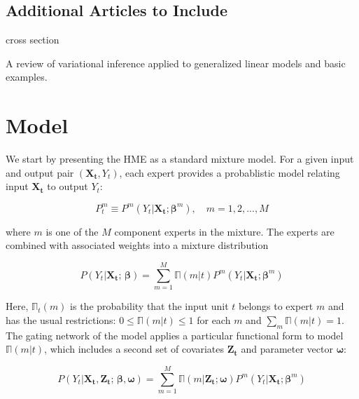 \documentclass[12pt]{article}
\newcommand{\expmixwt}[0]{\mathbb{\Pi}}
\begin{document}
\subsection{Additional Articles to Include}

\cite{JeffriesPfeiffer2001} cross section

\cite{BleiKucukelbirMcAuliffe2006} A review of variational inference applied
to generalized linear models and basic examples.

\cite{CarvalhoSkoulakis2005}

\bigskip


\section{Model} \label{sec:Model}

We start by presenting the HME as a standard mixture model.
For a given input and output pair $(\boldsymbol{X_{t}}, Y_{t})$, each expert
provides a probablistic model relating input $\boldsymbol{X_{t}}$ to output
$Y_{t}$:

\begin{equation} \label{eq:ConditionalDistribution}
  P^{m}_{t} \equiv P^{m}(Y_{t}|\boldsymbol{X_{t}}; \boldsymbol{\beta}^{m}), \quad m = 1,2,...,M
\end{equation}

where $m$ is one of the $M$ component experts in the mixture. The experts
are combined with associated weights into a mixture distribution

\begin{equation} \label{eq:staticmixture}
  P(Y_{t} | \boldsymbol{X_{t}}; \, \boldsymbol{\beta}) = \sum_{m=1}^{M} \expmixwt(m|t) P^{m}(Y_{t} | \boldsymbol{X_{t}}; \boldsymbol{\beta}^{m})
\end{equation}

Here, $\expmixwt_{t}(m)$ is the probability that the input unit $t$ belongs
to expert $m$ and has the usual restrictions: $0 \leq \expmixwt(m|t) \leq 1$
for each $m$ and $\sum_{m} \expmixwt(m|t) = 1$. The gating network of the model
applies a particular functional form to model $\expmixwt(m|t)$, which includes a
second set of covariates $\boldsymbol{Z_{t}}$ and parameter vector $\boldsymbol{\omega}$:

\begin{equation} \label{eq:mixture}
  P(Y_{t} | \boldsymbol{X_{t}}, \boldsymbol{Z_{t}}; \, \boldsymbol{\beta}, \boldsymbol{\omega}) = \sum_{m=1}^{M} \expmixwt(m | \boldsymbol{Z_{t}}; \boldsymbol{\omega}) P^{m}(Y_{t} | \boldsymbol{X_{t}}; \boldsymbol{\beta}^{m})
\end{equation}
\end{document}
